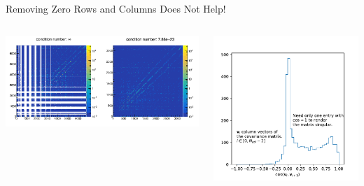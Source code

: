\documentclass[aspectratio=169]{beamer}
\begin{document}
\begin{frame}{Removing Zero Rows and Columns Does Not Help!}
  \begin{columns}
    \begin{column}{.68\textwidth}
      \includegraphics[width=\textwidth]{figures/iter2tol1e-15.png}
    \end{column}
    \begin{column}{.32\textwidth}
      \includegraphics[width=\textwidth]{figures/collinearity.pdf}
    \end{column}
  \end{columns}

\end{frame}
\end{document}
